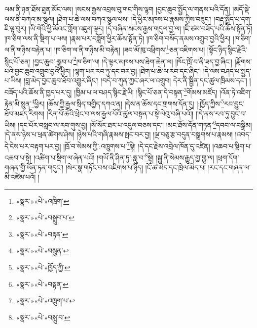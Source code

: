 ལམ་ནི་ཉན་ཐོས་ཐུན་མོང་ལས། །སངས་རྒྱས་འབྲས་བུ་གང་གིས་ལྷག །བྱང་ཆུབ་སྤྱོད་ལ་གནས་པའི་དོན། །མདོ་སྡེ་ལས་ནི་བཀའ་མ་སྩལ། །ཐེག་པ་ཆེ་ལས་བཀའ་སྩལ་པས། །དེ་ཕྱིར་མཁས་པ་རྣམས་ཀྱིས་བཟུང་། །བརྡ་སྤྲོད་པ་དག་ཇི་ལྟ་བུར། །ཡི་གེའི་ཕྱི་མོའང་ཀློག་འཇུག་ལྟར། །དེ་བཞིན་སངས་རྒྱས་གདུལ་བྱ་ལ། །ཇི་ཙམ་བཟོད་པའི་ཆོས་སྟོན་ཏོ། །ཁ་ཅིག་ལས་ནི་སྡིག་པ་ལས། །རྣམ་པར་བཟློག་ཕྱིར་ཆོས་སྟོན་ཏེ། །ཁ་ཅིག་བསོད་ནམས་འགྲུབ་བྱའི་ཕྱིར། །ཁ་ཅིག་ལ་ནི་གཉིས་བརྟེན་པ། །ཁ་ཅིག་ལ་ནི་གཉིས་མི་བརྟེན། །ཟབ་མོ་ཁུ་འཕྲིགས་\footnote{«སྣར་»«པེ་»འཁྲིག་}ཅན་འཇིགས་པ། །སྟོང་ཉིད་སྙིང་རྗེའི་སྙིང་པོ་ཅན། །བྱང་ཆུབ་:སྒྲུབ་པ་\footnote{«སྣར་»«པེ་»བསྒྲུབ་པ་}ཁ་ཅིག་ལ། །དེ་ལྟར་མཁས་པས་ཐེག་ཆེན་ལ། །ཁོང་ཁྲོ་བ་ནི་ཟད་བྱ་ཞིང་། །རྫོགས་པའི་བྱང་ཆུབ་འགྲུབ་བྱའི་ཕྱིར། །ལྷག་པར་རབ་ཏུ་དང་བར་བྱ། །ཐེག་པ་ཆེ་ལ་རབ་དང་ཞིང་། །དེ་ལས་བཤད་པ་སྤྱད་པ་ཡིས། །བླ་མེད་བྱང་ཆུབ་ཐོབ་འགྱུར་ཞིང་། །བདེ་བ་ཀུན་ཀྱང་ཞར་ལ་འགྲུབ། དེར་ནི་སྦྱིན་དང་ཚུལ་ཁྲིམས་དང་། །བཟོད་པའི་ཆོས་ནི་ཁྱད་པར་དུ། །ཁྱིམ་པ་ལ་བཤད་སྙིང་རྗེ་ཡི། །སྙིང་པོ་ཅན་དེ་བསྟན་\footnote{«སྣར་»«པེ་»བརྟན་}གོམས་མཛོད། །འོན་ཏེ་འཇིག་རྟེན་མི་སྲུན་\footnote{«སྣར་»«པེ་»བསྲུན་}ཕྱིར། །ཆོས་ཀྱི་རྒྱལ་སྲིད་བགྱིད་དཀའ་ན། །དེས་ན་ཆོས་དང་གྲགས་དོན་དུ། །:ཁྱོད་ཀྱིས་\footnote{«སྣར་»«པེ་»ཁྱོད་ཀྱི་}རབ་བྱུང་ཐོབ་མཛད་རིགས། །རིན་པོ་ཆེའི་ཕྲེང་བ་ལས་རྒྱལ་པོའི་ཚུལ་བསྟན་པ་སྟེ་ལེའུ་བཞི་པའོ།། །།དེ་ནས་རབ་ཏུ་བྱུང་བ་ཡིས། །དང་པོར་བསླབ་ལ་རབ་གུས་བྱ། །སོ་སོར་ཐར་པ་འདུལ་བཅས་དང་། །མང་ཐོས་དོན་གཏན་\footnote{«སྣར་»«པེ་»བསྟན་}དབབ་ལ་བསྒྲིམ། །དེ་ནས་ཉེས་པ་ཕྲན་ཚེགས་ཤེས། །ཉེས་པའི་གཞི་རྣམས་སྤང་བར་བྱ། །ལྔ་བཅུ་རྩ་བདུན་བསྒྲགས་པ་རྣམས། །འབད་དེ་ངེས་པར་བརྟག་པར་བྱ། །ཁྲོ་བ་སེམས་ཀྱི་:འཁྲུགས་པ་\footnote{«སྣར་»«པེ་»འཁྲུག་པ་}སྟེ། །དེ་དང་རྗེས་འབྲེལ་ཁོན་དུ་འཛིན། །འཆབ་པ་སྡིག་པ་འཆབ་པ་སྟེ། །འཚིག་པ་སྡིག་ལ་ཞེན་པའོ། །གཡོ་ནི་ཤིན་ཏུ་:སླུ་བ་\footnote{«སྣར་»«པེ་»བསླུ་བ་}སྟེ། །སྒྱུ་ནི་སེམས་རྒྱུད་གྱ་གྱུ་ལ། །ཕྲག་དོག་གཞན་གྱི་ཡོན་ཏན་གདུང་། །སེར་སྣ་གཏོང་བས་འཇིགས་པ་ཉིད། །ངོ་ཚ་མེད་དང་ཁྲེལ་མེད་པ། །རང་དང་གཞན་ལ་མི་འཛེམ་པའོ། །
